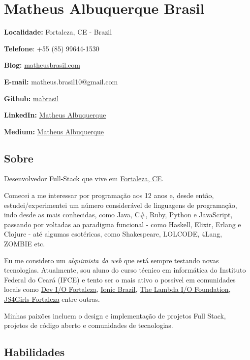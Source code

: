 \documentclass[]{article}
\date{}
\begin{document}
\section{Matheus Albuquerque Brasil}\label{matheus-albuquerque-brasil}

\textbf{Localidade:} Fortaleza, CE - Brazil

\textbf{Telefone}: +55 (85) 99644-1530

\textbf{Blog:} \href{http://matheusbrasil.com}{matheusbrasil.com}

\textbf{E-mail:} matheus.brasil10@gmail.com

\textbf{Github:} \href{https://github.com/mabrasil}{mabrasil}

\textbf{LinkedIn:}
\href{https://www.linkedin.com/in/matheusalbuquerque}{Matheus
Albuquerque}

\textbf{Medium:} \href{https://medium.com/@matheusalbuquerque}{Matheus
Albuquerque}

\subsection{Sobre}\label{sobre}

Desenvolvedor Full-Stack que vive em
\href{http://pt.wikipedia.org/wiki/Fortaleza}{Fortaleza, CE}.

Comecei a me interessar por programação aos 12 anos e, desde então,
estudei/experimentei um número considerável de linguagens de
programação, indo desde as mais conhecidas, como Java, C\#, Ruby, Python
e JavaScript, passando por voltadas ao paradigma funcional - como
Haskell, Elixir, Erlang e Clojure - até algumas esotéricas, como
Shakespeare, LOLCODE, 4Lang, ZOMBIE etc.

Eu me considero um \emph{alquimista da web} que está sempre testando
novas tecnologias. Atualmente, sou aluno do curso técnico em informática
do Instituto Federal do Ceará (IFCE) e tento ser o mais ativo o possível
em comunidades locais como
\href{https://www.facebook.com/groups/fortalezadevelopers/}{Dev I/O
Fortaleza}, \href{http://ionicbrazil.com/}{Ionic Brazil},
\href{https://github.com/lambda-io}{The Lambda I/O Foundation},
\href{http://js4girls-fortaleza.github.io/}{JS4Girls Fortaleza} entre
outras.

Minhas paixões incluem o design e implementação de projetos Full Stack,
projetos de código aberto e comunidades de tecnologias.

\subsection{Habilidades}\label{habilidades}
\end{document}
